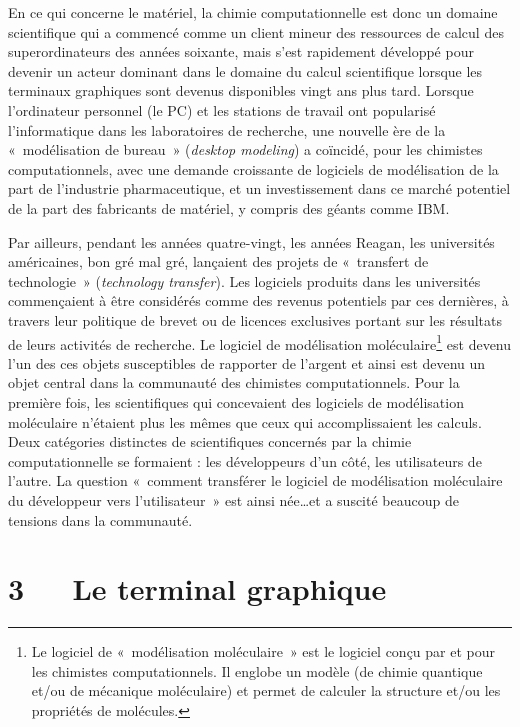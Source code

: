 \documentclass{FramateX}
\begin{document}
\begin{refsection}
En ce qui concerne le matériel, la chimie computationnelle est donc un
domaine scientifique qui a commencé comme un client mineur des
ressources de calcul des superordinateurs des années soixante, mais
s'est rapidement développé pour devenir un acteur
dominant dans le domaine du calcul scientifique lorsque les terminaux
graphiques sont devenus disponibles vingt ans plus tard. Lorsque
l'ordinateur personnel (le PC) et les stations de
travail ont popularisé l'informatique dans les
laboratoires de recherche, une nouvelle ère de la «~modélisation de
bureau~» (\textit{desktop modeling}) a coïncidé, pour les chimistes
computationnels, avec une demande croissante de logiciels de
modélisation de la part de l'industrie pharmaceutique,
et un investissement dans ce marché potentiel de la part des fabricants
de matériel, y compris des géants comme IBM.

Par ailleurs, pendant les années quatre-vingt, les années Reagan, les
universités américaines, bon gré mal gré, lançaient des projets de
«~transfert de technologie~» (\textit{technology transfer}). Les
logiciels produits dans les universités commençaient à être considérés
comme des revenus potentiels par ces dernières, à travers leur
politique de brevet ou de licences exclusives portant sur les résultats
de leurs activités de recherche. Le logiciel de modélisation
moléculaire\footnote{Le logiciel de «~modélisation moléculaire~» est le
logiciel conçu par et pour les chimistes computationnels. Il englobe un
modèle (de chimie quantique et/ou de mécanique moléculaire) et permet
de calculer la structure et/ou les propriétés de molécules. } est
devenu l'un des ces objets susceptibles de rapporter
de l'argent et ainsi est devenu un objet central dans
la communauté des chimistes computationnels. Pour la première fois, les
scientifiques qui concevaient des logiciels de modélisation moléculaire
n'étaient plus les mêmes que ceux qui accomplissaient
les calculs. Deux catégories distinctes de scientifiques concernés par
la chimie computationnelle se formaient : les développeurs
d'un côté, les utilisateurs de
l'autre. La question «~comment transférer le logiciel
de modélisation moléculaire du développeur vers
l'utilisateur~» est ainsi née\ldots et a suscité beaucoup
de tensions dans la communauté.

\section*{3~~~Le terminal graphique}
{}


\end{refsection}
\end{document}
